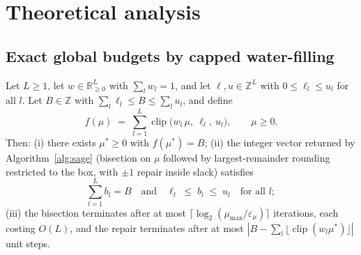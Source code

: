 \section{Theoretical analysis}\label{sec:theory}

\subsection{Exact global budgets by capped water-filling}

\begin{theorem}\label{thm:exact}
Let $L\ge1$, let $w\in\mathbb{R}_{\ge0}^{L}$ with $\sum_l w_l=1$, and let
$\ell,u\in\mathbb{Z}^{L}$ with $0\le\ell_l\le u_l$ for all $l$. Let
$B\in\mathbb{Z}$ with $\sum_l\ell_l\le B\le\sum_l u_l$, and define
\begin{equation}
f(\mu) \;=\; \sum_{l=1}^{L}\operatorname{clip}\!\bigl(w_l\,\mu,\ \ell_l,\
u_l\bigr),\qquad \mu\ge0 .
\end{equation}
Then: (i) there exists $\mu^{*}\ge0$ with $f(\mu^{*})=B$; (ii) the
integer vector returned by Algorithm~\ref{alg:sage} (bisection on $\mu$
followed by largest-remainder rounding restricted to the box, with
$\pm1$ repair inside slack) satisfies
\begin{equation}
\sum_{l=1}^{L} b_l = B \quad\text{and}\quad
\ell_l\;\le\; b_l\;\le\; u_l \quad\text{for all } l;
\end{equation}
(iii) the bisection terminates after at most
$\lceil\log_2(\mu_{\max}/\varepsilon_\mu)\rceil$ iterations, each costing
$O(L)$, and the repair terminates after at most $|B-\sum_l\lfloor
\operatorname{clip}(w_l\mu^{*})\rfloor|$ unit steps.
\end{theorem}

